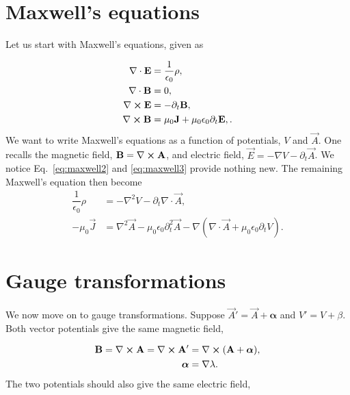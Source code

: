 \section{Maxwell's equations}
Let us start with Maxwell's equations, given as

\begin{align}
  \nabla \cdot \mathbf{E} &= \dfrac{1}{\epsilon_0}\rho, \label{eq:maxwell1} \\
  \nabla \cdot \mathbf{B} &= 0, \label{eq:maxwell2} \\
  \nabla \cross \mathbf{E} &= -\partial_t \mathbf{B}, \label{eq:maxwell3} \\
  \nabla \cross \mathbf{B} &= \mu_0 \mathbf{J} + \mu_0 \epsilon_0 \partial_t \mathbf{E}, \label{eq:maxwell4}.
\end{align}
We want to write Maxwell's equations as a function of potentials, $V$ and $\vec{A}$.
One recalls the magnetic field,
$\mathbf{B} = \nabla \cross \mathbf{A}$,
and electric field,
$\vec{E} = -\nabla V - \partial_t \vec{A}$.
We notice Eq.~\eqref{eq:maxwell2} and \eqref{eq:maxwell3} provide nothing new.
The remaining Maxwell's equation then become
\begin{align}
  \dfrac{1}{\epsilon_0}\rho &= -\nabla^2 V - \partial_t \nabla \cdot \vec{A}, \label{eq:div-electric-as-potential} \\
  -\mu_0 \vec{J} &= \nabla^2 \vec{A} - \mu_0 \epsilon_0 \partial_t^2 \vec{A} - \nabla \left( \nabla \cdot \vec{A} + \mu_0 \epsilon_0 \partial_t V \right). \label{eq:current-as-potential}
\end{align}

\section{Gauge transformations}
We now move on to gauge transformations.
Suppose $\vec{A}' = \vec{A}+\bm{\alpha}$ and $V' = V+\beta$.
Both vector potentials give the same magnetic field,

\begin{align}
  \mathbf{B} = \nabla \cross \mathbf{A} = \nabla \cross \mathbf{A}' &= \nabla \cross (\mathbf{A} + \bm{\alpha}), \nonumber \\
  \bm{\alpha} &= \nabla \lambda.
\end{align}
The two potentials should also give the same electric field,

